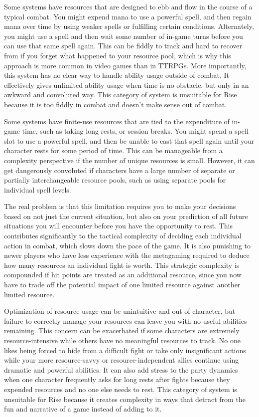     Some systems have resources that are designed to ebb and flow in the course of a typical combat.
    You might expend mana to use a powerful spell, and then regain mana over time by using weaker spells or fulfilling certain conditions.
    Alternately, you might use a spell and then wait some number of in-game turns before you can use that same spell again.
    This can be fiddly to track and hard to recover from if you forget what happened to your resource pool, which is why this approach is more common in video games than in TTRPGs.
    More importantly, this system has no clear way to handle ability usage outside of combat.
    It effectively gives unlimited ability usage when time is no obstacle, but only in an awkward and convoluted way.
    This category of system is unsuitable for Rise because it is too fiddly in combat and doesn't make sense out of combat.

    Some systems have finite-use resources that are tied to the expenditure of in-game time, such as taking long rests, or session breaks.
    You might spend a spell slot to use a powerful spell, and then be unable to cast that spell again until your character rests for some period of time.
    This can be manageable from a complexity perspective if the number of unique resources is small.
    However, it can get dangerously convoluted if characters have a large number of separate or partially interchangeable resource pools, such as using separate pools for individual spell levels.

    The real problem is that this limitation requires you to make your decisions based on not just the current situation, but also on your prediction of all future situations you will encounter before you have the opportunity to rest.
    This contributes significantly to the tactical complexity of deciding each individual action in combat, which slows down the pace of the game.
    It is also punishing to newer players who have less experience with the metagaming required to deduce how many resources an individual fight is worth.
    This strategic complexity is compounded if hit points are treated as an additional resource, since you now have to trade off the potential impact of one limited resource against another limited resource.

    Optimization of resource usage can be unintuitive and out of character, but failure to correctly manage your resources can leave you with no useful abilities remaining.
    This concern can be exacerbated if some characters are extremely resource-intensive while others have no meaningful resources to track.
    No one likes being forced to hide from a difficult fight or take only insignificant actions while your more resource-savvy or resource-independent allies continue using dramatic and powerful abilities.
    It can also add stress to the party dynamics when one character frequently asks for long rests after fights because they expended resources and no one else needs to rest.
    This category of system is unsuitable for Rise because it creates complexity in ways that detract from the fun and narrative of a game instead of adding to it.

